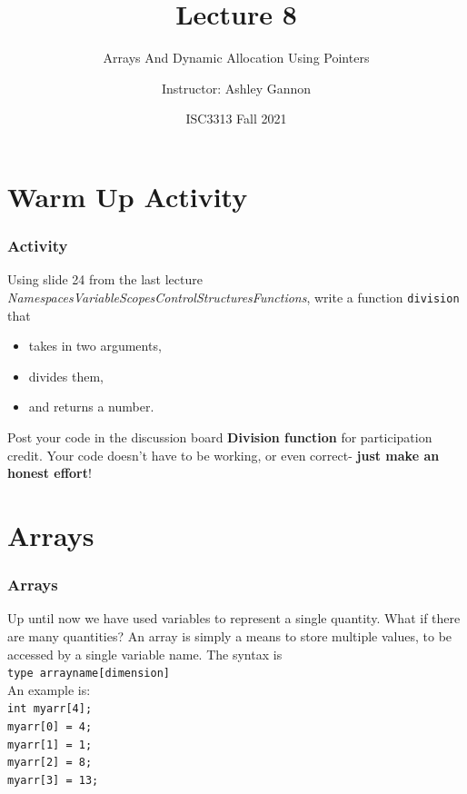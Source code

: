 \documentclass{if-beamer}
\title[Lecture 8]{Lecture 8}
\subtitle{Arrays And Dynamic Allocation Using Pointers}
\author{Instructor: Ashley Gannon}
\date{ISC3313 Fall 2021}
\begin{document}
\begin{frame}
  \titlepage  
\end{frame}
\section{Warm Up Activity}
\begin{frame}
\frametitle{Activity}
Using slide 24 from the last lecture \textit{NamespacesVariableScopesControlStructuresFunctions}, write a function \texttt{division} that 
\begin{itemize}
	\item takes in two arguments,\\
	\item divides them,\\
	\item and returns a number.\\
\end{itemize}   
\vspace{10pt}
Post your code in the discussion board \textbf{Division function} for participation credit. Your code doesn't have to be working, or even correct- \textbf{just make an honest effort}!  
\end{frame}

\section{Arrays}

\begin{frame}
\frametitle{Arrays}
\vspace{1.5cm}
Up until now we have used variables to represent a single quantity.
What if there are many quantities?  An array is simply a means to store
multiple values, to be accessed by a single variable name. The syntax
is \\
\vspace{5pt}
{\texttt{{type arrayname[dimension]}}} \\
\vspace{5pt}
An example is: \\
\vspace{5pt}
\texttt{int myarr[4];} \\
\texttt{myarr[0] = 4;} \\
\texttt{myarr[1] = 1;} \\
\texttt{myarr[2] = 8;} \\
\texttt{myarr[3] = 13;} \\
\end{frame}
\end{document}
